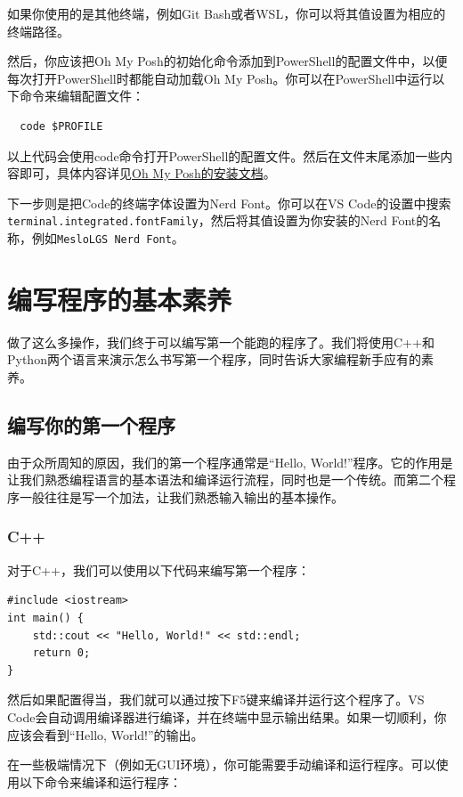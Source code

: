 \documentclass[../main.tex]{subfiles}
\begin{document}
如果你使用的是其他终端，例如Git Bash或者WSL，你可以将其值设置为相应的终端路径。

然后，你应该把Oh My Posh的初始化命令添加到PowerShell的配置文件中，以便每次打开PowerShell时都能自动加载Oh My Posh。你可以在PowerShell中运行以下命令来编辑配置文件：
\begin{verbatim}
  code $PROFILE
\end{verbatim}
以上代码会使用code命令打开PowerShell的配置文件。然后在文件末尾添加一些内容即可，具体内容详见\href{https://ohmyposh.dev/docs/installation/windows}{Oh My Posh的安装文档}。

下一步则是把Code的终端字体设置为Nerd Font。你可以在VS Code的设置中搜索\texttt{terminal.integrated.fontFamily}，然后将其值设置为你安装的Nerd Font的名称，例如\texttt{MesloLGS Nerd Font}。


\section{编写程序的基本素养}

做了这么多操作，我们终于可以编写第一个能跑的程序了。我们将使用C++和Python两个语言来演示怎么书写第一个程序，同时告诉大家编程新手应有的素养。

\subsection{编写你的第一个程序}

由于众所周知的原因，我们的第一个程序通常是“Hello, World!”程序。它的作用是让我们熟悉编程语言的基本语法和编译运行流程，同时也是一个传统。而第二个程序一般往往是写一个加法，让我们熟悉输入输出的基本操作。

\subsubsection{C++}

对于C++，我们可以使用以下代码来编写第一个程序：

\begin{verbatim}
#include <iostream>
int main() {
    std::cout << "Hello, World!" << std::endl;
    return 0;
}
\end{verbatim}

然后如果配置得当，我们就可以通过按下F5键来编译并运行这个程序了。VS Code会自动调用编译器进行编译，并在终端中显示输出结果。如果一切顺利，你应该会看到“Hello, World!”的输出。

在一些极端情况下（例如无GUI环境），你可能需要手动编译和运行程序。可以使用以下命令来编译和运行程序：
\end{document}
